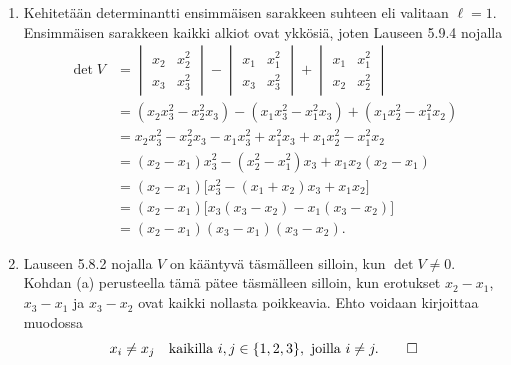 \documentclass[11pt,a4paper]{amsart}
\begin{document}
\begin{solution}
  \leavevmode\par
  \begin{enumerate}[label=(\alph*), leftmargin=*]
    \item Kehitetään determinantti ensimmäisen sarakkeen suhteen
      eli valitaan \(\ell=1\). Ensimmäisen sarakkeen kaikki alkiot
      ovat ykkösiä, joten Lauseen 5.9.4 nojalla
      \[
        \begin{aligned}
          \det V
          &=
          \begin{vmatrix}x_2 & x_2^2 \\ x_3 & x_3^2
          \end{vmatrix}
          -
          \begin{vmatrix}x_1 & x_1^2 \\ x_3 & x_3^2
          \end{vmatrix}
          +
          \begin{vmatrix}x_1 & x_1^2 \\ x_2 & x_2^2
          \end{vmatrix} \\
          &= (x_2x_3^2-x_2^2x_3)-(x_1x_3^2-x_1^2x_3)
            +(x_1x_2^2-x_1^2x_2) \\
          &= x_2x_3^2-x_2^2x_3-x_1x_3^2+x_1^2x_3+x_1x_2^2-x_1^2x_2 \\
          &= (x_2-x_1)x_3^2-(x_2^2-x_1^2)x_3+x_1x_2(x_2-x_1) \\
          &= (x_2-x_1)\bigl[x_3^2-(x_1+x_2)x_3+x_1x_2\bigr] \\
          &= (x_2-x_1)\bigl[x_3(x_3-x_2)-x_1(x_3-x_2)\bigr] \\
          &= (x_2-x_1)(x_3-x_1)(x_3-x_2).
        \end{aligned}
      \]

    \item Lauseen 5.8.2 nojalla \(V\) on kääntyvä täsmälleen silloin,
      kun \(\det V\ne 0\). Kohdan (a) perusteella tämä pätee
      täsmälleen silloin, kun erotukset \(x_2-x_1\), \(x_3-x_1\)
      ja \(x_3-x_2\) ovat kaikki nollasta poikkeavia. Ehto voidaan
      kirjoittaa muodossa
      \[
        x_i\ne x_j
        \quad\text{kaikilla } i,j\in\{1,2,3\},\ \text{joilla } i\ne j.
        \qedhere
      \]
  \end{enumerate}
\end{solution}
\end{document}
